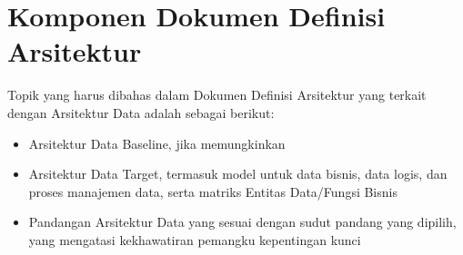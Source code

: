 \section{Komponen Dokumen Definisi Arsitektur}
\label{sec:dokumen_definisi_arsitektur_data}
Topik yang harus dibahas dalam Dokumen Definisi Arsitektur yang terkait dengan Arsitektur Data adalah sebagai berikut:
\begin{itemize}
	\item Arsitektur Data Baseline, jika memungkinkan
	\item Arsitektur Data Target, termasuk model untuk data bisnis, data logis, dan proses manajemen data, serta matriks Entitas Data/Fungsi Bisnis
	\item Pandangan Arsitektur Data yang sesuai dengan sudut pandang yang dipilih, yang mengatasi kekhawatiran pemangku kepentingan kunci
\end{itemize}

